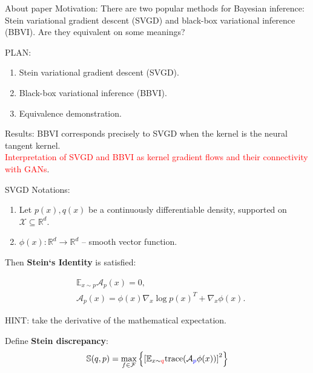 \documentclass{beamer}
\title[\hbox to 56mm{\titleName}]{\titleName}
\institute{Кафедра Интеллектуальных систем МФТИ}
\author[И.\,М.~Латыпов]{И.\,М.~Латыпов}
\date{2024}
\begin{document}
\begin{frame}
\thispagestyle{empty}
\maketitle
\end{frame}


\begin{frame}{About paper}
    Motivation:  There are two popular methods for Bayesian inference: Stein variational gradient descent (SVGD)\cite{liu2016stein} and black-box variational inference (BBVI). Are they equivalent on some meanings?

    \par
    PLAN:
    \begin{enumerate}
        \item  Stein variational gradient descent (SVGD).
        \item  Black-box variational inference (BBVI).
        \item  Equivalence demonstration.
    \end{enumerate}
    
    \noindent\makebox[\linewidth]{\rule{\paperwidth}{0.4pt}}
    Results: BBVI corresponds precisely to SVGD when the kernel is the neural tangent kernel. \\
    \textcolor{red}{Interpretation of SVGD and BBVI as kernel gradient flows and their connectivity with GANs}.
    
\end{frame}

\begin{frame}{SVGD}
Notations:
\begin{enumerate}
    \item  Let $p(x), q(x)$ be a continuously differentiable  density, supported on $\mathcal{X} \subseteq \mathbb{R}^d$.
    \item $\phi(x): \mathbb{R}^d \rightarrow \mathbb{R}^d$ -- smooth vector function.    
\end{enumerate}
Then \textbf{Stein`s Identity} is satisfied:

\begin{align}
&\mathbb{E}_{x\sim p} \mathcal{A}_p(x) = 0, \\
&\mathcal{A}_p(x) = \phi(x)\nabla_x \log p(x)^T + \nabla_x \phi(x).
\end{align}

HINT: take the derivative of the mathematical expectation.

Define \textbf{Stein discrepancy}:
\begin{equation}
\mathbb{S}(q, p) = \max_{f\in \mathcal{F}}\left\{ \left[\mathbb{E}_{x\sim \color{red} q} \text{trace}(\mathcal{A}_{ \color{blue} p}\phi(x))\right]^2 \right\}
\end{equation}

\end{frame}
\end{document}
